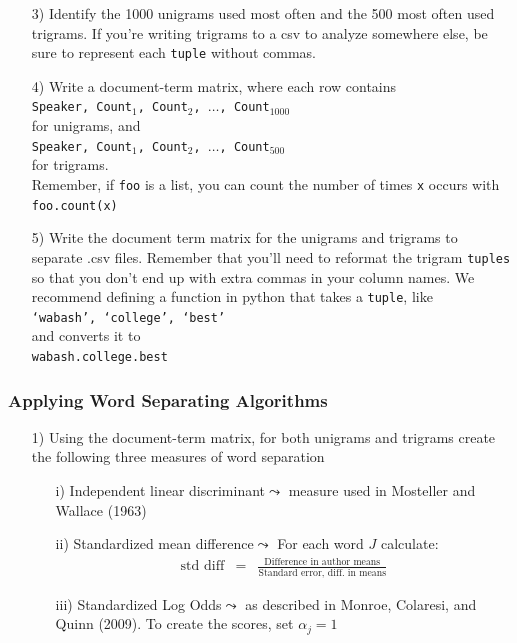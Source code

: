 \documentclass[12pt,letterpaper]{article}
\begin{document}
\begin{itemize}
\item[3)] Identify the 1000 unigrams used most often and the 500 most often used trigrams.  If you're writing trigrams to a csv to analyze somewhere else, be sure to represent each {\tt tuple} without commas.  
\item[4)] Write a document-term matrix, where each row contains \\
{\tt Speaker, Count$_1$, Count$_2$, $\hdots$, Count$_{1000}$ }\\
for unigrams, and \\
{\tt Speaker, Count$_1$, Count$_2$, $\hdots$, Count$_{500}$ }\\
for trigrams. \\

Remember, if {\tt foo} is a list, you can count the number of times {\tt x} occurs with \\
{\tt foo.count(x)}

\item[5)] Write the document term matrix for the unigrams and trigrams to separate .csv files.  Remember that you'll need to reformat the trigram {\tt tuples} so that you don't end up with extra commas in your column names. We recommend defining a function in python that takes a {\tt tuple}, like \\
{\tt `wabash', `college', `best'} \\
and converts it to\\
{\tt wabash.college.best}
\end{itemize}



\subsubsection*{Applying Word Separating Algorithms}

\begin{itemize}
\item[1)] Using the document-term matrix, for both unigrams and trigrams create the following three measures of word separation
\begin{itemize}
\item[i)] Independent linear discriminant$\leadsto$ measure used in Mosteller and Wallace (1963) 
\item[ii)] Standardized mean difference$\leadsto$ For each word $J$ calculate:
\begin{eqnarray}
\text{std diff} & = &\frac{\text{Difference in author means}}{\text{Standard error, diff. in means}}\nonumber 
\end{eqnarray}
\item[iii)] Standardized Log Odds$\leadsto$ as described in Monroe, Colaresi, and Quinn (2009). To create the scores,  set $\alpha_{j} = 1$
\end{itemize}
\end{itemize}
\end{document}
